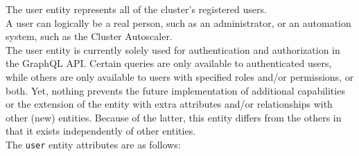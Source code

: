 The user entity represents all of the cluster's registered users. \\ %
A user can logically be a real person, such as an administrator, or an automation
system, such as the Cluster Autoscaler. \\ %
The user entity is currently solely used for authentication and authorization in
the GraphQL API. Certain queries are only available to authenticated users,
while others are only available to users with specified roles and/or permissions,
or both. Yet, nothing prevents the future implementation of additional capabilities
or the extension of the entity with extra attributes and/or relationships with other
(new) entities. Because of the latter, this entity differs from the others in that
it exists independently of other entities. \\ %
The \texttt{user} entity attributes are as follows:
